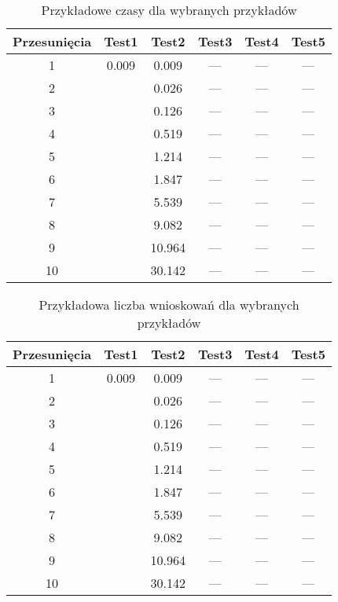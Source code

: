     \begin{table}[H]
        \centering
         \begin{tabular}{||c | c | c | c | c | c |} 
         \hline
         Przesunięcia & Test1 & Test2 & Test3 & Test4 & Test5 \\ [0.5ex] 
         \hline\hline
         1 & 0.009 & 0.009 & --- & --- & --- \\ 
         \hline
         2 &  & 0.026 & --- & --- & --- \\
         \hline
         3 &  & 0.126 & --- & --- & --- \\
         \hline
         4 &  & 0.519 & --- & --- & --- \\
         \hline
         5 &  & 1.214 & --- & --- & --- \\
         \hline
         6 &  & 1.847 & --- & --- & ---\\ 
         \hline
         7 &  & 5.539 & --- & --- & --- \\
         \hline
         8 &  & 9.082 & --- & --- & --- \\
         \hline
         9 &  & 10.964 & --- & --- & --- \\
         \hline
         10 &  & 30.142 & --- & --- & --- \\ [1ex]
         \hline
         \end{tabular}
         \caption{Przykładowe czasy dla wybranych przykładów}
    \end{table}

    \begin{table}[H]
        \centering
         \begin{tabular}{||c | c | c | c | c | c |} 
         \hline
         Przesunięcia & Test1 & Test2 & Test3 & Test4 & Test5 \\ [0.5ex] 
         \hline\hline
         1 & 0.009 & 0.009 & --- & --- & --- \\ 
         \hline
         2 &  & 0.026 & --- & --- & --- \\
         \hline
         3 &  & 0.126 & --- & --- & --- \\
         \hline
         4 &  & 0.519 & --- & --- & --- \\
         \hline
         5 &  & 1.214 & --- & --- & --- \\
         \hline
         6 &  & 1.847 & --- & --- & ---\\ 
         \hline
         7 &  & 5.539 & --- & --- & --- \\
         \hline
         8 &  & 9.082 & --- & --- & --- \\
         \hline
         9 &  & 10.964 & --- & --- & --- \\
         \hline
         10 &  & 30.142 & --- & --- & --- \\ [1ex]
         \hline
         \end{tabular}
         \caption{Przykładowa liczba wnioskowań dla wybranych przykładów}
    \end{table}

